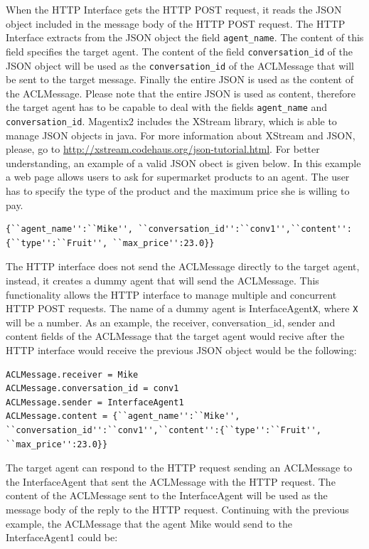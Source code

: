 When the HTTP Interface gets the HTTP POST request, it reads the JSON object included in the message body of the HTTP POST request. The HTTP Interface extracts from the JSON object the field \texttt{agent\_name}. The content of this field specifies the target agent. The content of the field \texttt{conversation\_id} of the JSON object will be used as the \texttt{conversation\_id} of the ACLMessage that will be sent to the target message. Finally the entire JSON is used as the content of the ACLMessage. Please note that the entire JSON is used as content, therefore the target agent has to be capable to deal with the fields \texttt{agent\_name} and \texttt{conversation\_id}. Magentix2 includes the XStream library, which is able to manage JSON objects in java. For more information about XStream and JSON, please, go to \url{http://xstream.codehaus.org/json-tutorial.html}. For better understanding, an example of a valid JSON obect is given below. In this example a web page allows users to ask for supermarket products to an agent. The user has to specify the type of the product and the maximum price she is willing to pay.

\begin{lstlisting}
{``agent_name'':``Mike'', ``conversation_id'':``conv1'',``content'':{``type'':``Fruit'', ``max_price'':23.0}}
\end{lstlisting}

The HTTP interface does not send the ACLMessage directly to the target agent, instead, it creates a dummy agent that will send the ACLMessage. This functionality allows the HTTP interface to manage multiple and concurrent HTTP POST requests. The name of a dummy agent is InterfaceAgent\texttt{X}, where \texttt{X} will be a number. As an example, the receiver, conversation\_id, sender and content fields of the ACLMessage that the target agent would recive after the HTTP interface would receive the previous JSON object would be the following:

\begin{lstlisting}
ACLMessage.receiver = Mike
ACLMessage.conversation_id = conv1
ACLMessage.sender = InterfaceAgent1
ACLMessage.content = {``agent_name'':``Mike'', ``conversation_id'':``conv1'',``content'':{``type'':``Fruit'', ``max_price'':23.0}}
\end{lstlisting}

The target agent can respond to the HTTP request sending an ACLMessage to the InterfaceAgent that sent the ACLMessage with the HTTP request. The content of the ACLMessage sent to the InterfaceAgent will be used as the message body of the reply to the HTTP request. Continuing with the previous example, the ACLMessage that the agent Mike would send to the InterfaceAgent1 could be:

